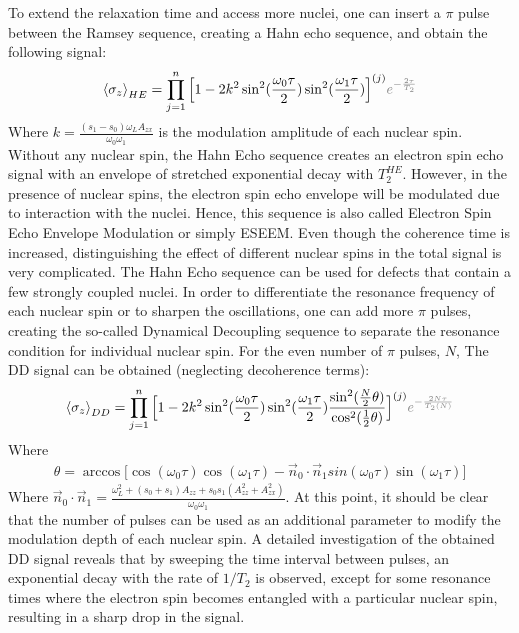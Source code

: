 \documentclass[%
 reprint,
superscriptaddress,
 amsmath,amssymb,
 aps,
]{revtex4-2}
\begin{document}
To extend the relaxation time and access more nuclei, one can insert a $\pi$ pulse between the Ramsey sequence, creating a Hahn echo sequence, and obtain the following signal:
\begin{gather}
	\expval{\sigma_z}_{HE} = \prod_{j=1}^n \Big[1 - 2 k^2 
	\sin^2(\frac{\omega_0 \tau}{2}) \sin^2(\frac{\omega_1 \tau}{2})\Big]^{(j)} \textcolor{gray}{ e^{-\frac{2\tau}{T_2}}}
\end{gather}
Where $k = \frac{(s_1-s_0)\omega_L A_{zx}}{\omega_0 \omega_1}$ is the modulation amplitude of each nuclear spin.
Without any nuclear spin, the Hahn Echo sequence creates an electron spin echo signal with an envelope of stretched exponential decay with $T_2^{HE}$.
However, in the presence of nuclear spins, the electron spin echo envelope will be modulated due to interaction with the nuclei.
Hence, this sequence is also called Electron Spin Echo Envelope Modulation or simply ESEEM.
Even though the coherence time is increased, distinguishing the effect of different nuclear spins in the total signal is very complicated.
The Hahn Echo sequence can be used for defects that contain a few strongly coupled nuclei.
In order to differentiate the resonance frequency of each nuclear spin or to sharpen the oscillations, one can add more $\pi$ pulses, creating the so-called Dynamical Decoupling sequence to separate the resonance condition for individual nuclear spin. For the even number of $\pi$ pulses, $N$, The DD signal can be obtained (neglecting decoherence terms):
\begin{gather} \label{eq:DD}
	\expval{\sigma_z}_{DD} =
	\prod_{j=1}^n \Big[1- 2 k^2  
	\sin^2(\frac{\omega_0 \tau}{2}) \sin^2(\frac{\omega_1 \tau}{2}) \frac{\sin^2(\frac{N}{2} \theta)}{\cos^2(\frac{1}{2}\theta)}  \Big]^{(j)} \textcolor{gray}{ e^{-\frac{2N\tau}{T_2(N)}}} 
\end{gather}
\normalsize
Where
\begin{gather}
	\theta=  \arccos\Big[\cos(\omega_0 \tau) \cos(\omega_1 \tau)- \vec{n}_0 \cdot \vec{n}_1 sin(\omega_0 \tau) \sin(\omega_1 \tau) \Big]
\end{gather}
Where $\vec{n}_0 \cdot \vec{n}_1 = \frac{\omega_L^2+(s_0+s_1)A_{zz}+s_0 s_1 (A_{zz}^2+A_{zx}^2)}{\omega_0 \omega_1}$.
At this point, it should be clear that the number of pulses can be used as an additional parameter to modify the modulation depth of each nuclear spin.
A detailed investigation of the obtained DD signal reveals that by sweeping the time interval between pulses, an exponential decay with the rate of $1/T_2$ is observed, except for some resonance times where the electron spin becomes entangled with a particular nuclear spin, resulting in a sharp drop in the signal.
\end{document}
